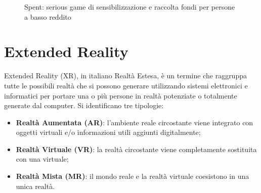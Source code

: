 \begin{figure} [h!]
    \center
    \caption{Spent: serious game di sensibilizzazione e raccolta fondi per persone a basso reddito \cite{spentGame}}
    \label{fig:spentGame}
\end{figure}
%
\section{Extended Reality}
\label{sec:xr}
Extended Reality (XR), in italiano Realtà Estesa, è un termine che raggruppa tutte le possibili realtà che si possono generare utilizzando sistemi elettronici e informatici per portare una o più persone in realtà potenziate o totalmente generate dal computer.
Si identificano tre tipologie:

\begin{itemize}
    \item \textbf{Realtà Aumentata (AR)}: l'ambiente reale circostante viene integrato con oggetti virtuali e/o informazioni utili aggiunti digitalmente;
    \item \textbf{Realtà Virtuale (VR)}: la realtà circostante viene completamente sostituita con una virtuale;
    \item \textbf{Realtà Mista (MR)}: il mondo reale e la realtà virtuale coesistono in una unica realtà.
\end{itemize}

